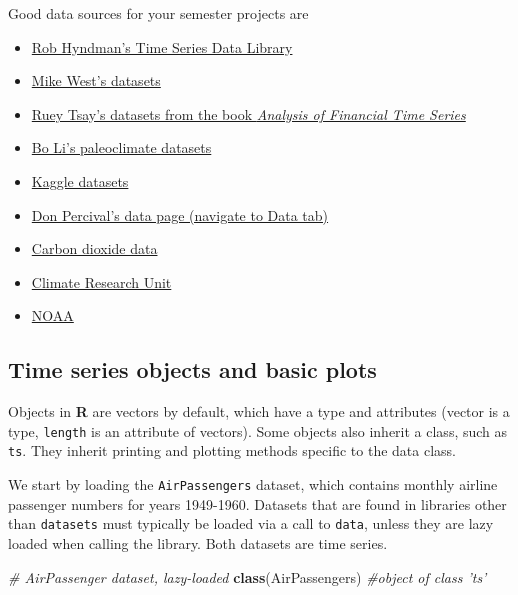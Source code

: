\documentclass[]{book}
\newenvironment{Shaded}{\begin{snugshade}}{\end{snugshade}}
\newcommand{\KeywordTok}[1]{\textcolor[rgb]{0.13,0.29,0.53}{\textbf{#1}}}
\newcommand{\CommentTok}[1]{\textcolor[rgb]{0.56,0.35,0.01}{\textit{#1}}}
\newcommand{\NormalTok}[1]{#1}
\providecommand{\tightlist}{%
  \setlength{\itemsep}{0pt}\setlength{\parskip}{0pt}}
\begin{document}
Good data sources for your semester projects are

\begin{itemize}
\tightlist
\item
  \href{https://datamarket.com/data/list/?q=provider\%3Atsdl}{Rob
  Hyndman's Time Series Data Library}
\item
  \href{http://www2.stat.duke.edu/~mw/ts_data_sets.html}{Mike West's
  datasets}
\item
  \href{https://faculty.chicagobooth.edu/ruey.tsay/teaching/fts/}{Ruey
  Tsay's datasets from the book \emph{Analysis of Financial Time
  Series}}
\item
  \href{http://publish.illinois.edu/boli-uiuc/paleoclimate/}{Bo Li's
  paleoclimate datasets}
\item
  \href{https://www.kaggle.com/datasets}{Kaggle datasets}
\item
  \href{http://faculty.washington.edu/dbp/s519/}{Don Percival's data
  page (navigate to Data tab)}
\item
  \href{http://cdiac.esd.ornl.gov/trends/co2/contents.htm}{Carbon
  dioxide data}
\item
  \href{http://www.cru.uea.ac.uk/}{Climate Research Unit}
\item
  \href{https://data.noaa.gov/dataset}{NOAA}
\end{itemize}

\subsection{Time series objects and basic
plots}\label{time-series-objects-and-basic-plots}

Objects in \textbf{R} are vectors by default, which have a type and
attributes (vector is a type, \texttt{length} is an attribute of
vectors). Some objects also inherit a class, such as \texttt{ts}. They
inherit printing and plotting methods specific to the data class.

We start by loading the \texttt{AirPassengers} dataset, which contains
monthly airline passenger numbers for years 1949-1960. Datasets that are
found in libraries other than \texttt{datasets} must typically be loaded
via a call to \texttt{data}, unless they are lazy loaded when calling
the library. Both datasets are time series.

\begin{Shaded}
\begin{Highlighting}[]
\CommentTok{# AirPassenger dataset, lazy-loaded}
\KeywordTok{class}\NormalTok{(AirPassengers)  }\CommentTok{#object of class 'ts'}
\end{Highlighting}
\end{Shaded}
\end{document}
